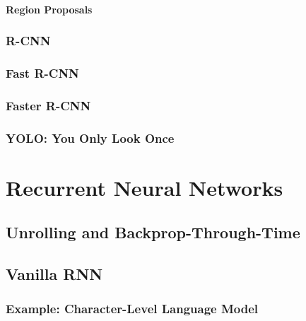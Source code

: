 			\subsubsection{Region Proposals} %

		\subsection{R-CNN} %

		\subsection{Fast R-CNN} %

		\subsection{Faster R-CNN} %

		\subsection{YOLO: You Only Look Once} %

\chapter{Recurrent Neural Networks} %

	\section{Unrolling and Backprop-Through-Time} %

	\section{Vanilla RNN} %

		\subsection{Example: Character-Level Language Model} %

